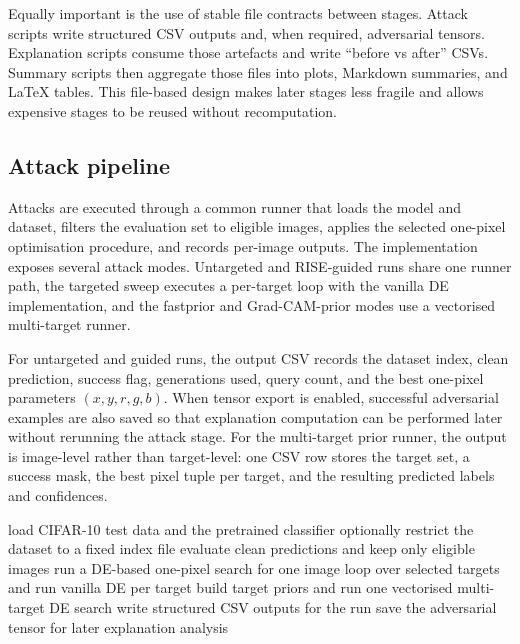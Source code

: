 Equally important is the use of stable file contracts between stages. Attack scripts write
structured CSV outputs and, when required, adversarial tensors. Explanation scripts consume
those artefacts and write ``before vs after'' CSVs. Summary scripts then aggregate those files
into plots, Markdown summaries, and \LaTeX{} tables. This file-based design makes later stages
less fragile and allows expensive stages to be reused without recomputation.

\subsection{Attack pipeline}
Attacks are executed through a common runner that loads the model and dataset, filters the
evaluation set to eligible images, applies the selected one-pixel optimisation procedure, and
records per-image outputs. The implementation exposes several attack modes. Untargeted and
RISE-guided runs share one runner path, the targeted sweep executes a per-target loop with the
vanilla DE implementation, and the fastprior and Grad-CAM-prior modes use a vectorised
multi-target runner.

For untargeted and guided runs, the output CSV records the dataset index, clean prediction,
success flag, generations used, query count, and the best one-pixel parameters
$(x,y,r,g,b)$. When tensor export is enabled, successful adversarial examples are also saved so
that explanation computation can be performed later without rerunning the attack stage. For the
multi-target prior runner, the output is image-level rather than target-level: one CSV row
stores the target set, a success mask, the best pixel tuple per target, and the resulting
predicted labels and confidences.

\begin{algorithm}[tbp]
\caption{Top-level attack runner behaviour}
\label{alg:attack_runner}
\begin{algorithmic}
    \State load CIFAR-10 test data and the pretrained classifier
    \State optionally restrict the dataset to a fixed index file
    \State evaluate clean predictions and keep only eligible images
            \State run a DE-based one-pixel search for one image
            \State loop over selected targets and run vanilla DE per target
        \Else
            \State build target priors and run one vectorised multi-target DE search
        \EndIf
        \State write structured CSV outputs for the run
            \State save the adversarial tensor for later explanation analysis
        \EndIf
    \EndFor
\EndProcedure
\end{algorithmic}
\end{algorithm}

